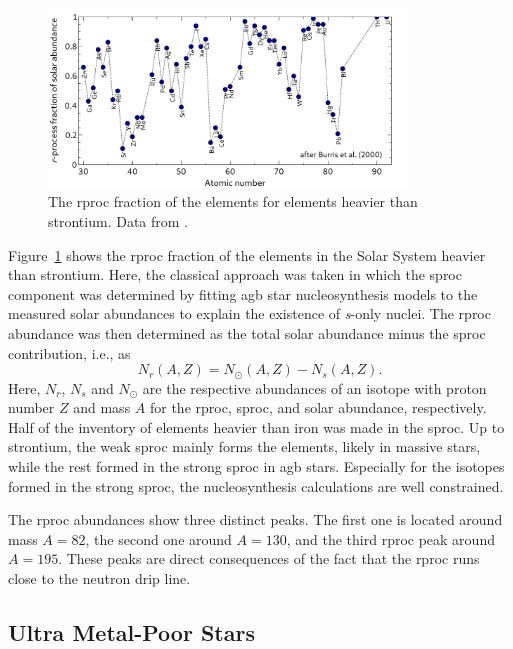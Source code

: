 \begin{figure}[tb]
    \centering
    \includegraphics[width=0.85\textwidth]{graphics/r-process/rproc_abus}
    \caption{The \ac{rproc} fraction of the elements for elements heavier than strontium. Data from \citet{burris2000}.}
    \label{fig:r-process:r-process_fraction_solar_system_burris}
\end{figure}
Figure~\ref{fig:r-process:r-process_fraction_solar_system_burris} shows the \ac{rproc} fraction of the elements in the Solar System heavier than strontium. Here, the classical approach was taken in which the \ac{sproc} component was determined by fitting \ac{agb} star nucleosynthesis models to the measured solar abundances to explain the existence of \textit{s}-only nuclei. The \ac{rproc} abundance was then determined as the total solar abundance minus the \ac{sproc} contribution, i.e., as
\begin{equation}
    N_r(A,Z) = N_\odot(A,Z) - N_s(A,Z).
\end{equation}
Here, $N_r$, $N_s$ and $N_\odot$ are the respective abundances of an isotope with proton number $Z$ and mass $A$ for the \ac{rproc}, \ac{sproc}, and solar abundance, respectively. Half of the inventory of elements heavier than iron was made in the \ac{sproc}. Up to strontium, the weak \ac{sproc} mainly forms the elements, likely in massive stars, while the rest formed in the strong \ac{sproc} in \ac{agb} stars. Especially for the isotopes formed in the strong \ac{sproc}, the nucleosynthesis calculations are well constrained. 

The \ac{rproc} abundances show three distinct peaks. The first one is located around mass $A=82$, the second one around $A=130$, and the third \ac{rproc} peak around $A=195$. These peaks are direct consequences of the fact that the \ac{rproc} runs close to the neutron drip line.

\subsection{Ultra Metal-Poor Stars}

